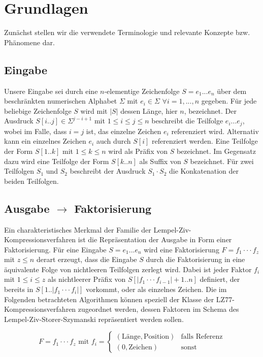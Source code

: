 \chapter{Grundlagen}

Zunächst stellen wir die verwendete Terminologie und relevante Konzepte bzw. Phänomene dar.

\section{Eingabe}
Unsere Eingabe sei durch eine $n$-elementige Zeichenfolge $S=e_1...e_n$ über dem beschränkten numerischen Alphabet $\Sigma$ mit $e_i\in \Sigma$ $\forall i=1,...,n$ gegeben. Für jede
beliebige Zeichenfolge $S$ wird mit $|S|$ dessen Länge, hier $n$, bezeichnet. Der Ausdruck $S[i..j]\in \Sigma^{j-i+1}$ mit $1\leq i\leq j\leq n$ beschreibt die Teilfolge $e_i...e_j$,
wobei im Falle, dass $i=j$ ist, das einzelne Zeichen $e_i$ referenziert wird. Alternativ kann ein einzelnes Zeichen $e_i$ auch durch $S[i]$ referenziert werden. Eine Teilfolge 
der Form $S[1..k]$ mit $1\leq k\leq n$ wird als Präfix von $S$ bezeichnet. Im Gegensatz dazu wird eine Teilfolge der Form $S[k..n]$ als Suffix von $S$ bezeichnet. Für zwei Teilfolgen
$S_1$ und $S_2$ beschreibt der Ausdruck $S_1\cdot S_2$ die Konkatenation der beiden Teilfolgen.

\section{Ausgabe $\rightarrow$ Faktorisierung}
Ein charakteristisches Merkmal der Familie der Lempel-Ziv-Kompressionsverfahren ist die Repräsentation der Ausgabe in Form einer Faktorisierung. Für eine Eingabe $S=e_1...e_n$ 
wird eine Faktorisierung $F=f_1\cdot\cdot\cdot f_z$ mit $z\leq n$ derart erzeugt, dass die Eingabe $S$ durch die Faktorisierung in eine äquivalente Folge von nichtleeren Teilfolgen 
zerlegt wird. Dabei ist jeder Faktor $f_i$ mit $1\leq i\leq z$ als nichtleerer Präfix von $S[|f_1\cdot\cdot\cdot f_{i-1}|+1..n]$ definiert, der bereits in $S[1..|f_1\cdot\cdot\cdot f_i|]$ 
vorkommt, oder als einzelnes Zeichen. Die im Folgenden betrachteten Algorithmen können speziell der Klasse der LZ77-Kompressionsverfahren zugeordnet werden, dessen Faktoren im Schema 
des Lempel-Ziv-Storer-Szymanski \cite{lzss} repräsentiert werden sollen. 

\begin{equation} \label{eq:faktor}
    F = f_1\cdot\cdot\cdot f_z \text{ mit } f_i = \begin{cases} (\text{Länge}, \text{Position}) & \text{falls Referenz} \\ (0, \text{Zeichen}) & \text{sonst} \end{cases}
\end{equation}


